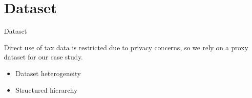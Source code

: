 \section{Dataset}

\begin{frame}{Dataset}

    Direct use of tax data is restricted due to privacy concerns, so we rely on a proxy dataset for our case study.\\
  

    \begin{itemize}
        \item<3-> Dataset heterogeneity
        \item<4-> Structured hierarchy
    \end{itemize}
\end{frame}



